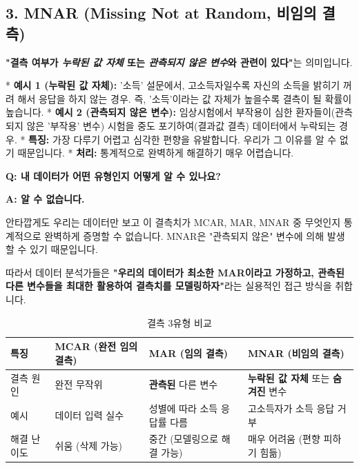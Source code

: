 \documentclass[11pt,a4paper]{book}
\theoremstyle{definition}
\begin{document}
\subsection{3. MNAR (Missing Not at Random, 비임의 결측)}

\textbf{"결측 여부가 \textit{누락된 값 자체} 또는 \textit{관측되지 않은 변수}와 관련이 있다"}는 의미입니다.

* \textbf{예시 1 (누락된 값 자체):} '소득' 설문에서, 고소득자일수록 자신의 소득을 밝히기 꺼려 해서 응답을 하지 않는 경우. 즉, '소득'이라는 값 자체가 높을수록 결측이 될 확률이 높습니다.
* \textbf{예시 2 (관측되지 않은 변수):} 임상시험에서 부작용이 심한 환자들이(관측되지 않은 '부작용' 변수) 시험을 중도 포기하여(결과값 결측) 데이터에서 누락되는 경우.
* \textbf{특징:} 가장 다루기 어렵고 심각한 편향을 유발합니다. 우리가 그 이유를 알 수 없기 때문입니다.
* \textbf{처리:} 통계적으로 완벽하게 해결하기 매우 어렵습니다.

\begin{warningbox}
    \textbf{Q: 내 데이터가 어떤 유형인지 어떻게 알 수 있나요?}

    \textbf{A: 알 수 없습니다.}

    안타깝게도 우리는 데이터만 보고 이 결측치가 MCAR, MAR, MNAR 중 무엇인지 통계적으로 완벽하게 증명할 수 없습니다. MNAR은 "관측되지 않은" 변수에 의해 발생할 수 있기 때문입니다.

    따라서 데이터 분석가들은 \textbf{"우리의 데이터가 최소한 MAR이라고 가정하고, 관측된 다른 변수들을 최대한 활용하여 결측치를 모델링하자"}라는 실용적인 접근 방식을 취합니다.
\end{warningbox}

\begin{table}[h!]
    \centering
    \begin{tabular}{@{}llll@{}}
        \toprule
        특징 & MCAR (완전 임의 결측) & MAR (임의 결측) & MNAR (비임의 결측) \\
        \midrule
        결측 원인 & 완전 무작위 & \textbf{관측된} 다른 변수 & \textbf{누락된 값 자체} 또는 \textbf{숨겨진} 변수 \\
        예시 & 데이터 입력 실수 & 성별에 따라 소득 응답률 다름 & 고소득자가 소득 응답 거부 \\
        해결 난이도 & 쉬움 (삭제 가능) & 중간 (모델링으로 해결 가능) & 매우 어려움 (편향 피하기 힘듦) \\
        \bottomrule
    \end{tabular}
    \caption{결측 3유형 비교}
    \label{tab:mar_types}
\end{table}
\end{document}
